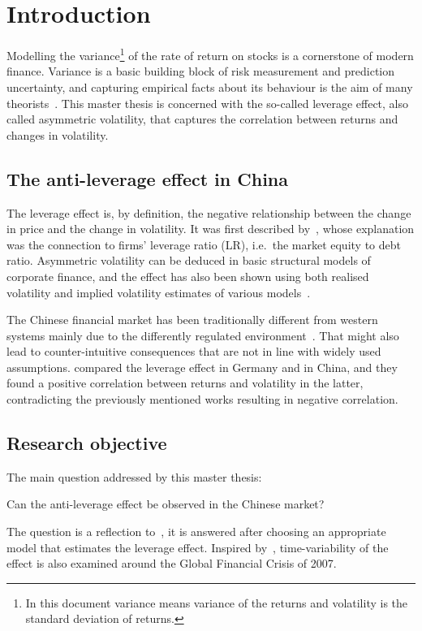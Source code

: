 \section{Introduction}

Modelling the variance\footnote{In this document variance means variance of the returns and volatility is the standard deviation of returns.} of the rate of return on stocks is a cornerstone of modern finance.
Variance is a basic building block of risk measurement and prediction uncertainty, and capturing empirical facts about its behaviour is the aim of many theorists~\citep{Christie1982}.
This master thesis is concerned with the so-called leverage effect, also called asymmetric volatility, that captures the correlation between returns and changes in volatility.

\subsection{The anti-leverage effect in China}

The leverage effect is, by definition, the negative relationship between the change in price and the change in volatility.
It was first described by~\citet{black1976studies}, whose explanation was the connection to firms' leverage ratio (LR), i.e.\ the market equity to debt ratio.
Asymmetric volatility can be deduced in basic structural models of corporate finance, and the effect has also been shown using both realised volatility and implied volatility estimates of various models~\citep{Christie1982,french1987expected,Harvey1996,Bouchaud2001}.

The Chinese financial market has been traditionally different from western systems mainly due to the differently regulated environment~\citep{GORDON2003}.
That might also lead to counter-intuitive consequences that are not in line with widely used assumptions.
\citet{Shen2009} compared the leverage effect in Germany and in China, and they found a positive correlation between returns and volatility in the latter, contradicting the previously mentioned works resulting in negative correlation.


\subsection{Research objective}

The main question addressed by this master thesis:
\begin{center}
	Can the anti-leverage effect be observed in the Chinese market?
\end{center}
The question is a reflection to~\citet{Shen2009}, it is answered after choosing an appropriate model that estimates the leverage effect.
Inspired by~\citet{Christensen2015}, time-variability of the effect is also examined around the Global Financial Crisis of 2007.
